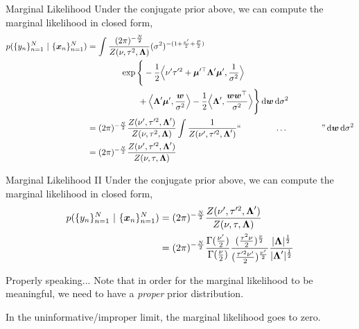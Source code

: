 \documentclass[aspectratio=169]{beamer}
\begin{document}
\begin{frame}{Marginal Likelihood}
Under the conjugate prior above, we can compute the marginal likelihood in closed form,
\begin{align}
    \nonumber
    p(\{y_n\}_{n=1}^N ~\vert~ \{\boldsymbol{x}_n\}_{n=1}^N) &=
    \int \frac{(2\pi)^{-\frac{N}{2}}}{Z(\nu, \tau^2, \boldsymbol{\Lambda})} (\sigma^2)^{-(1 + \frac{\nu'}{2} + \frac{P}{2})}  \\
    \nonumber
    & \hspace{4em} 
    \exp\Bigg\{ 
    -\frac{1}{2} \Big\langle \nu' \tau'^2 + \boldsymbol{\mu}'^\top \boldsymbol{\Lambda}' \boldsymbol{\mu}', \frac{1}{\sigma^2} \Big\rangle \\
    &\hspace{6em}
    + \Big\langle \boldsymbol{\Lambda}' \boldsymbol{\mu}', \frac{\boldsymbol{w}}{\sigma^2} \Big\rangle 
    -\frac{1}{2} \Big\langle \boldsymbol{\Lambda}', \frac{\boldsymbol{w} \boldsymbol{w}^\top}{\sigma^2} \Big\rangle
    \Bigg\}  \mathop{}\!\mathrm{d}{\boldsymbol{w}} \mathop{}\!\mathrm{d}{\sigma^2} \\
    &= (2\pi)^{-\frac{N}{2}} \frac{Z(\nu', \tau'^2, \boldsymbol{\Lambda}')}{Z(\nu, \tau^2, \boldsymbol{\Lambda})} 
    \int \frac{1}{Z(\nu', \tau'^2, \boldsymbol{\Lambda}')} 
    ``\hspace{4em} \ldots \hspace{4em}" \mathop{}\!\mathrm{d}{\boldsymbol{w}} \mathop{}\!\mathrm{d}{\sigma^2} \\
    &= (2\pi)^{-\frac{N}{2}} \frac{Z(\nu', \tau'^2, \boldsymbol{\Lambda}')}{Z(\nu, \tau, \boldsymbol{\Lambda})} 
\end{align}
\end{frame}

\begin{frame}{Marginal Likelihood II}
Under the conjugate prior above, we can compute the marginal likelihood in closed form,
\begin{align}
    p(\{y_n\}_{n=1}^N ~\vert~ \{\boldsymbol{x}_n\}_{n=1}^N) &= (2\pi)^{-\frac{N}{2}} \frac{Z(\nu', \tau'^2, \boldsymbol{\Lambda}')}{Z(\nu, \tau, \boldsymbol{\Lambda})} \\ 
    &= (2\pi)^{-\frac{N}{2}} \frac{\Gamma(\frac{\nu'}{2})}{\Gamma(\frac{\nu}{2})} \frac{(\frac{\tau^2 \nu}{2})^{\frac{\nu}{2}}}{(\frac{\tau'^2 \nu'}{2})^{\frac{\nu'}{2}}}
    \frac{|\boldsymbol{\Lambda}|^{\frac{1}{2}}}{|\boldsymbol{\Lambda}'|^{\frac{1}{2}}}
\end{align}
\end{frame}

\begin{frame}{Properly speaking...}
Note that in order for the marginal likelihood to be meaningful, we need to have a \emph{proper} prior distribution. 

In the uninformative/improper limit, the marginal likelihood goes to zero. 
    
\end{frame}
\end{document}
